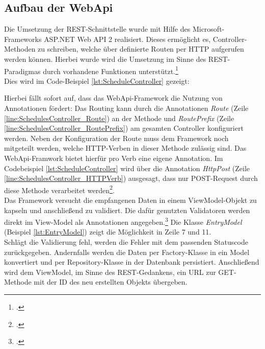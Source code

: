 \subsection{Aufbau der WebApi}
\label{ssec:aufbau-webapi}
Die Umsetzung der REST-Schnittstelle wurde mit Hilfe des Microsoft-Frameworks \ac{ASP.NET Web API 2} realisiert. Dieses ermöglicht es, Controller-Methoden zu schreiben, welche über definierte Routen per HTTP aufgerufen werden können. Hierbei wurde wird die Umsetzung im Sinne des REST-Paradigmas durch vorhandene Funktionen unterstützt.\footcite[S. 2ff.]{Building-a-REST-Service}\\
Dies wird im Code-Beispiel \ref{lst:ScheduleController} gezeigt:

Hierbei fällt sofort auf, dass das WebApi-Framework die Nutzung von Annotationen fördert: Das Routing kann durch die Annotationen \textit{Route} (Zeile \ref{line:SchedulesController_Route}) an der Methode und \textit{RoutePrefix} (Zeile \ref{line:SchedulesController_RoutePrefix}) am gesamten Controller konfiguriert werden. Neben der Konfiguration der Route muss dem Framework noch mitgeteilt werden, welche HTTP-Verben in dieser Methode zulässig sind. Das WebApi-Framwork bietet hierfür pro Verb eine eigene Annotation. Im Codebeispiel \ref{lst:ScheduleController} wird über die Annotation \textit{HttpPost} (Zeile \ref{line:SchedulesController_HTTPVerb}) ausgesagt, dass nur POST-Request durch diese Methode verarbeitet werden\footcite{webApi-AttributeRouting}. \\
Das Framework versucht die empfangenen Daten in einem ViewModel-Objekt zu kapseln und anschließend zu validiert. Die dafür genutzten Validatoren werden direkt im View-Model als Annotationen angegeben.\footcite{webApi-Validation} Die Klasse \textit{EntryModel} (Beispiel \ref{lst:EntryModel}) zeigt die Möglichkeit in Zeile 7 und 11. \\ 
Schlägt die Validierung fehl, werden die Fehler mit dem passenden Statuscode zurückgegeben. Andernfalls werden die Daten per \ac{Factory}-Klasse in ein Model konvertiert und per \ac{Repository}-Klasse in der Datenbank persistiert. Anschließend wird dem ViewModel, im Sinne des REST-Gedankens, ein URL zur GET-Methode mit der ID des neu erstellten Objekts übergeben. 

